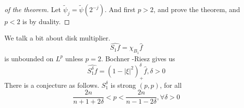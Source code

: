 \begin{proof}[of the theorem]
    Let $\tilde{\psi}_j=\tilde{\psi}(2^{-j})$. And first $p>2$, and prove the theorem, and $p<2$ is by duality.
\end{proof}

We talk a bit about disk multiplier.
\begin{equation*}
    \widehat{S_1f}=\chi_{B_1}\hat{f}
\end{equation*}
is unbounded on $L^p$ unless $p=2$. Bochner -Riesz gives us
\begin{equation*}
    \widehat{S_1^\delta f}=(1-|\xi|^2)_+^\delta\hat{f}, \delta>0
\end{equation*}
There is a conjecture as follows.
$S_1^\delta$ is strong $(p,p)$, for all 
\begin{equation*}
    \frac{2n}{n+1+2\delta}<p<\frac{2n}{n-1-2\delta}, \forall\delta>0
\end{equation*}
